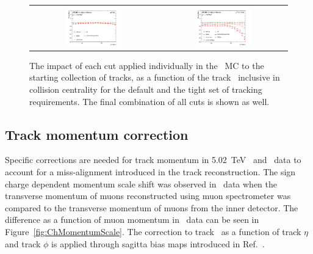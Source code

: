 \begin{figure}
\centering
\begin{tabular}{cc}
\includegraphics[width=0.45\textwidth]{figures/main/performance/PbPb_cutflow_pptight.pdf} &
\includegraphics[width=0.45\textwidth]{figures/main/performance/PbPb_cutflow_pptight_tight.pdf} \\
\end{tabular}
\caption{The impact of each cut applied individually in the \PbPb\ MC 
to the starting collection of tracks, as a function of the track \pT\ inclusive in collision centrality for the default and the tight set of tracking requirements.
The final combination of all cuts
is shown as well.}
\label{fig:PbPbcutflow_eta}
\end{figure}



\subsection{Track momentum correction}
\label{Sec:Trackmomentumcorrection}
Specific corrections are needed for track momentum in 5.02~TeV \pp\ and \PbPb\ data to account for a miss-alignment introduced in the track reconstruction.
The sign charge dependent momentum scale shift was observed in \pp\ data when the transverse momentum of muons reconstructed using muon spectrometer was compared to the transverse momentum of muons from the inner detector.
The difference as a function of muon momentum in \pbpb\ data can be seen in Figure~\ref{fig:ChMomentumScale}.
The correction to track \pt\ as a function of track $\eta$ and track $\phi$ is applied through sagitta bias maps introduced in Ref.~\cite{TrackingRec}.

